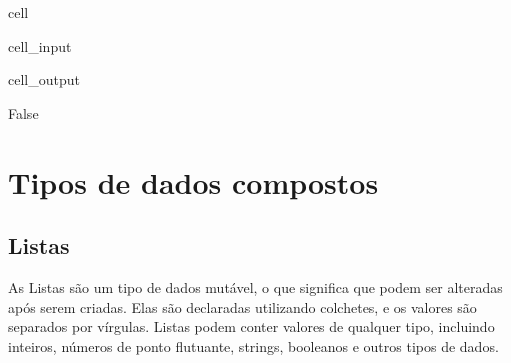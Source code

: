 \documentclass[letterpaper,10pt,english]{jupyterBook}
\begin{document}
\begin{sphinxuseclass}{cell}\begin{sphinxVerbatimInput}

\begin{sphinxuseclass}{cell_input}
\begin{sphinxVerbatim}[commandchars=\\\{\}]
  

  

  
\end{sphinxVerbatim}

\end{sphinxuseclass}\end{sphinxVerbatimInput}
\begin{sphinxVerbatimOutput}

\begin{sphinxuseclass}{cell_output}
\begin{sphinxVerbatim}[commandchars=\\\{\}]
False
\end{sphinxVerbatim}

\end{sphinxuseclass}\end{sphinxVerbatimOutput}

\end{sphinxuseclass}

\section{Tipos de dados compostos}
\label{\detokenize{chapters/ch2/ch2:tipos-de-dados-compostos}}

\subsection{Listas}
\label{\detokenize{chapters/ch2/ch2:listas}}
\sphinxAtStartPar
As Listas são um tipo de dados mutável, o que significa que podem ser alteradas após serem criadas. Elas são declaradas utilizando colchetes, e os valores são separados por vírgulas.
Listas podem conter valores de qualquer tipo, incluindo inteiros, números de ponto flutuante, strings, booleanos e outros tipos de dados.
\end{document}
